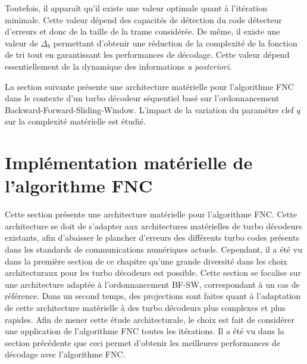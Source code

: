 Toutefois, il apparaît qu'il existe une valeur optimale quant à l’itération minimale. Cette valeur dépend des capacités 
de détection du code détecteur d'erreurs et donc de la taille de la trame considérée. De même, il existe une valeur de 
$\Delta_b$ permettant d'obtenir une réduction de la complexité de la fonction de tri tout en garantissant les performances de 
décodage. Cette valeur dépend essentiellement de la dynamique des informations \textit{a posteriori}.

La section suivante présente une architecture matérielle pour l'algorithme FNC dans le contexte d'un turbo décodeur 
séquentiel basé sur l'ordonnancement Backward-Forward-Sliding-Window. L'impact de 
la variation du paramètre clef $q$ sur la complexité matérielle est étudié. 


\section{Implémentation matérielle de l'algorithme FNC}
Cette section présente une architecture matérielle pour l'algorithme FNC. Cette architecture se doit de 
s'adapter aux architectures matérielles de turbo décodeurs existants, afin d’abaisser le plancher d'erreurs des différents turbo codes présents dans 
les standards de communications numériques actuels. Cependant, il a été vu dans la première section de ce chapitre qu'une 
grande diversité dans les choix architecturaux pour les turbo décodeurs est possible. Cette section se focalise sur 
 une architecture adaptée à l'ordonnancement BF-SW, correspondant à un cas de référence. Dans un second temps, des projections
 sont faites quant à l'adaptation de cette architecture matérielle à des turbo décodeurs plus 
complexes et plus rapides. 
Afin de mener cette étude architecturale, 
le choix est fait de considérer une application de l'algorithme FNC toutes les itérations. Il a été vu dans la section 
précédente que ceci permet d'obtenir les meilleures performances de décodage avec l'algorithme FNC.

